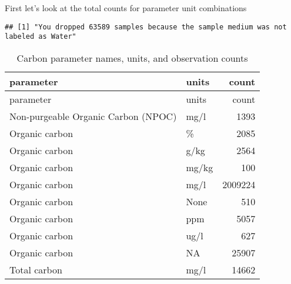 \documentclass[]{article}
\newenvironment{Shaded}{\begin{snugshade}}{\end{snugshade}}
\newcommand{\CommentTok}[1]{\textcolor[rgb]{0.56,0.35,0.01}{\textit{#1}}}
\newcommand{\DataTypeTok}[1]{\textcolor[rgb]{0.13,0.29,0.53}{#1}}
\newcommand{\KeywordTok}[1]{\textcolor[rgb]{0.13,0.29,0.53}{\textbf{#1}}}
\newcommand{\NormalTok}[1]{#1}
\newcommand{\OperatorTok}[1]{\textcolor[rgb]{0.81,0.36,0.00}{\textbf{#1}}}
\newcommand{\StringTok}[1]{\textcolor[rgb]{0.31,0.60,0.02}{#1}}
\begin{document}
First let's look at the total counts for parameter unit combinations

\begin{Shaded}
\end{Shaded}

\begin{verbatim}
## [1] "You dropped 63589 samples because the sample medium was not labeled as Water"
\end{verbatim}

\begin{Shaded}
\end{Shaded}

\begin{longtable}[]{@{}llr@{}}
\caption{Carbon parameter names, units, and observation
counts}\tabularnewline
\toprule
parameter & units & count\tabularnewline
\midrule
\endfirsthead
\toprule
parameter & units & count\tabularnewline
\midrule
\endhead
Non-purgeable Organic Carbon (NPOC) & mg/l & 1393\tabularnewline
Organic carbon & \% & 2085\tabularnewline
Organic carbon & g/kg & 2564\tabularnewline
Organic carbon & mg/kg & 100\tabularnewline
Organic carbon & mg/l & 2009224\tabularnewline
Organic carbon & None & 510\tabularnewline
Organic carbon & ppm & 5057\tabularnewline
Organic carbon & ug/l & 627\tabularnewline
Organic carbon & NA & 25907\tabularnewline
Total carbon & mg/l & 14662\tabularnewline
\bottomrule
\end{longtable}
\end{document}
